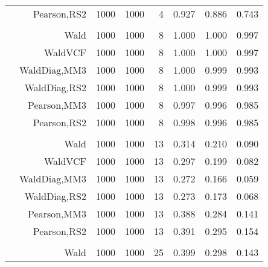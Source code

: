 \documentclass[
]{article}
\begin{document}
\begin{table}[H]
{\begin{tabular}[t]{lrrrrrrr}
\hspace{1em} & Pearson,RS2 & 1000 & 1000 & 4 & 0.927 & 0.886 & 0.743\\
\cmidrule{1-8}
\addlinespace[0.3em]
\multicolumn{8}{l}{\textbf{1F 15V}}\\
\hspace{1em} & Wald & 1000 & 1000 & 8 & 1.000 & 1.000 & 0.997\\

\hspace{1em} & WaldVCF & 1000 & 1000 & 8 & 1.000 & 1.000 & 0.997\\

\hspace{1em} & WaldDiag,MM3 & 1000 & 1000 & 8 & 1.000 & 0.999 & 0.993\\

\hspace{1em} & WaldDiag,RS2 & 1000 & 1000 & 8 & 1.000 & 0.999 & 0.993\\

\hspace{1em} & Pearson,MM3 & 1000 & 1000 & 8 & 0.997 & 0.996 & 0.985\\

\hspace{1em} & Pearson,RS2 & 1000 & 1000 & 8 & 0.998 & 0.996 & 0.985\\
\cmidrule{1-8}
\addlinespace[0.3em]
\multicolumn{8}{l}{\textbf{2F 10V}}\\
\hspace{1em} & Wald & 1000 & 1000 & 13 & 0.314 & 0.210 & 0.090\\

\hspace{1em} & WaldVCF & 1000 & 1000 & 13 & 0.297 & 0.199 & 0.082\\

\hspace{1em} & WaldDiag,MM3 & 1000 & 1000 & 13 & 0.272 & 0.166 & 0.059\\

\hspace{1em} & WaldDiag,RS2 & 1000 & 1000 & 13 & 0.273 & 0.173 & 0.068\\

\hspace{1em} & Pearson,MM3 & 1000 & 1000 & 13 & 0.388 & 0.284 & 0.141\\

\hspace{1em} & Pearson,RS2 & 1000 & 1000 & 13 & 0.391 & 0.295 & 0.154\\
\cmidrule{1-8}
\addlinespace[0.3em]
\multicolumn{8}{l}{\textbf{3F 15V}}\\
\hspace{1em} & Wald & 1000 & 1000 & 25 & 0.399 & 0.298 & 0.143\\


\end{tabular}}
\end{table}
\end{document}
